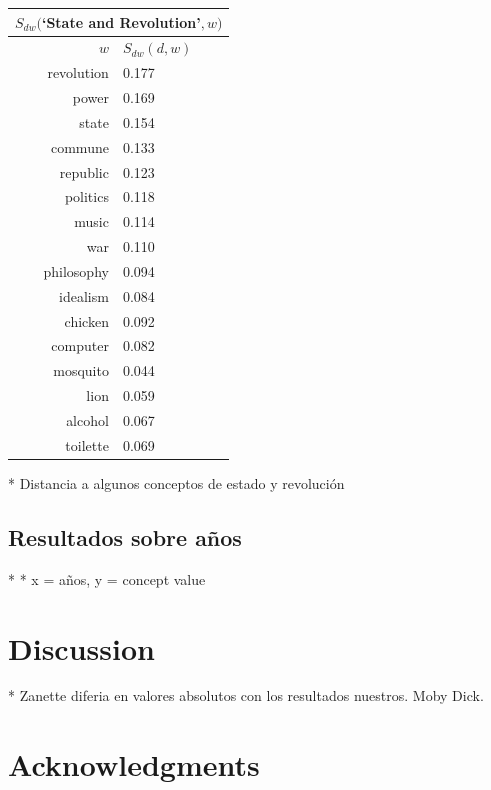 \documentclass{pnastwo}
\begin{document}
\begin{article}
\begin{center}
  \begin{tabular}{ | r |l |}
    \hline
    \multicolumn{2}{|c|}{$S_{dw}($`State and Revolution'$, w)$} \\ \hline
      $w$ & $S_{dw}(d, w)$ \\ \hline
      revolution &  0.177  \\ \hline
      power &  0.169  \\ \hline
      state &  0.154  \\ \hline
      commune &  0.133  \\ \hline
      republic &  0.123  \\ \hline
      politics &  0.118  \\ \hline
      music &  0.114  \\ \hline
      war &  0.110  \\ \hline
      philosophy &  0.094  \\ \hline
      idealism &  0.084  \\ \hline
      chicken &  0.092  \\ \hline
      computer &  0.082  \\ \hline
      mosquito &  0.044  \\ \hline
      lion &  0.059  \\ \hline
      alcohol &  0.067  \\ \hline
      toilette &  0.069  \\ \hline
  \end{tabular}
\end{center}





* Distancia a algunos conceptos de estado y revolución

\subsection{Resultados sobre años}
*
* x = {años}, y = {concept value}

\section{Discussion}
* Zanette diferia en valores absolutos con los resultados nuestros. Moby Dick. 

\section{Acknowledgments}


\end{article}
\end{document}
